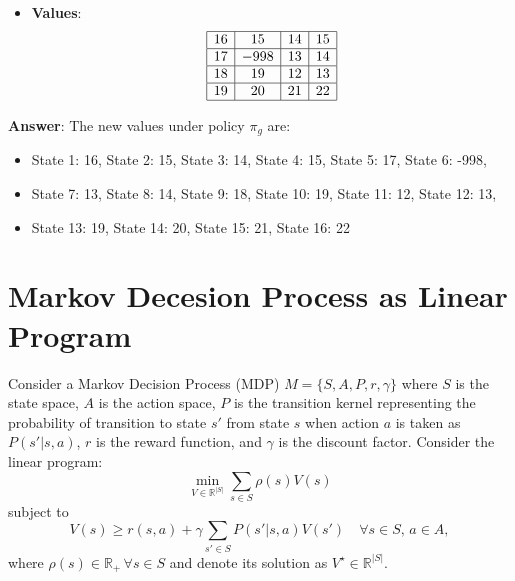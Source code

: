 \documentclass[a3paper,12pt]{extarticle} %
\begin{document}
\begin{enumerate}
\begin{itemize}
\begin{itemize}
        \end{itemize}
        \item \textbf{Values}:
        \[
        \begin{array}{|c|c|c|c|}
        \hline
        16 & 15 & 14 & 15 \\
        \hline
        17 & -998 & 13 & 14 \\
        \hline
        18 & 19 & 12 & 13 \\
        \hline
        19 & 20 & 21 & 22 \\
        \hline
        \end{array}
        \]
    \end{itemize}
    
    \textbf{Answer}: The new values under policy \( \pi_g \) are:
    \begin{itemize}
        \item State 1: 16, State 2: 15, State 3: 14, State 4: 15, State 5: 17, State 6: -998,
        \item State 7: 13, State 8: 14, State 9: 18, State 10: 19, State 11: 12, State 12: 13,
        \item State 13: 19, State 14: 20, State 15: 21, State 16: 22
    \end{itemize}
\end{enumerate}

\newpage


\newpage
\section{Markov Decesion Process as Linear Program}
Consider a Markov Decision Process (MDP) $M = \{S, A, P, r, \gamma\}$ where $S$ is the state space, $A$ is the action space, $P$ is the transition kernel representing the probability of transition to state $s'$ from state $s$ when action $a$ is taken as $P(s'|s, a)$, $r$ is the reward function, and $\gamma$ is the discount factor. Consider the linear program:
\[
\min_{V \in \mathbb{R}^{|S|}} \sum_{s \in S} \rho(s)V(s)
\]
subject to
\[
V(s) \geq r(s, a) + \gamma \sum_{s' \in S} P(s'|s, a)V(s') \quad \forall s \in S, \, a \in A,
\]
where $\rho(s) \in \mathbb{R}_+ \, \forall s \in S$ and denote its solution as $V^\star \in \mathbb{R}^{|S|}$.
\end{document}
